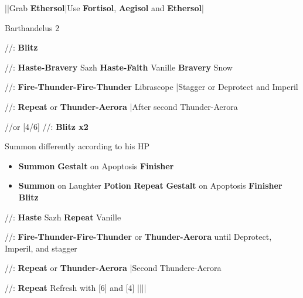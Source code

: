 \begin{mainlist}
	\item {}|\skip|Grab \textbf{Ethersol}|Use \textbf{Fortisol}, \textbf{Aegisol} and \textbf{Ethersol}|\skip
\end{mainlist}
\begin{fight}{Barthandelus 2}
	\item [4] \com/\com/\rav: \textbf{Blitz}
	\item [5] \syn/\rav/\sab: \textbf{Haste-Bravery} Sazh \to \textbf{Haste-Faith} Vanille \to \textbf{Bravery} Snow
	\item [3] \rav/\rav/\sab: \textbf{Fire-Thunder-Fire-Thunder} \to Librascope |Stagger or Deprotect and Imperil
	\item [2] \rav/\rav/\rav: \textbf{Repeat} or \textbf{Thunder-Aerora} |After second Thunder-Aerora
	\item [1] \com/\com/\med or [4/6] \com/\com/\rav: \textbf{Blitz x2}
	\item Summon differently according to his HP
	\begin{itemize}
		\item \textbf{Summon} \to \textbf{Gestalt} on Apoptosis \to \textbf{Finisher}
		\item \textbf{Summon} on Laughter \to \textbf{Potion} \to  \textbf{Repeat} \to \textbf{Gestalt} on Apoptosis \to \textbf{Finisher} \to \textbf{Blitz}
	\end{itemize}
	\item [5] \syn/\rav/\sab: \textbf{Haste} Sazh \to \textbf{Repeat} Vanille
	\item [3] \rav/\rav/\sab: \textbf{Fire-Thunder-Fire-Thunder} or \textbf{Thunder-Aerora} until Deprotect, Imperil, and stagger
	\item [2] \com/\rav/\rav: \textbf{Repeat} or \textbf{Thunder-Aerora} |Second Thundere-Aerora
	\item [1] \com/\com/\med: \textbf{Repeat} \to Refresh with [6] and [4] |\skip|\skip||\save
\end{fight}
